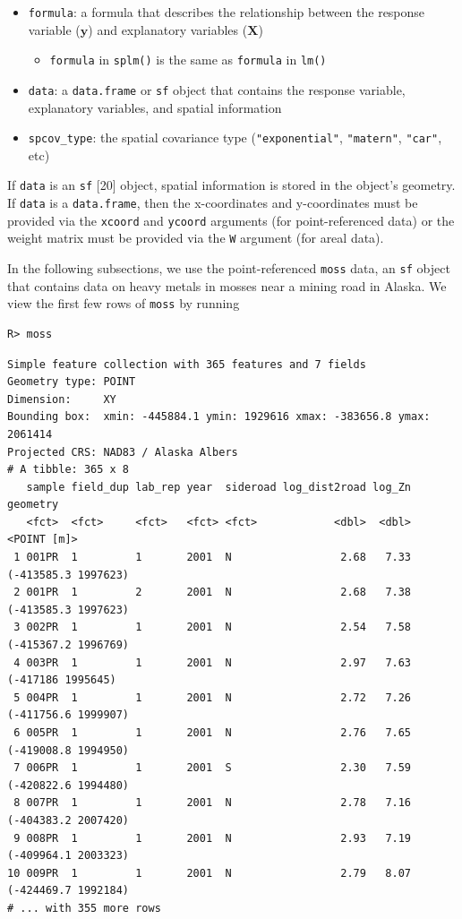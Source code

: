 \documentclass[10pt,letterpaper]{article}
\providecommand{\tightlist}{%
  \setlength{\itemsep}{0pt}\setlength{\parskip}{0pt}}
\begin{document}
\begin{itemize}
\tightlist
\item
  \texttt{formula}: a formula that describes the relationship between
  the response variable (\(\mathbf{y}\)) and explanatory variables
  (\(\mathbf{X}\))

  \begin{itemize}
  \tightlist
  \item
    \texttt{formula} in \texttt{splm()} is the same as \texttt{formula}
    in \texttt{lm()}
  \end{itemize}
\item
  \texttt{data}: a \texttt{data.frame} or \texttt{sf} object that
  contains the response variable, explanatory variables, and spatial
  information
\item
  \texttt{spcov\_type}: the spatial covariance type
  (\texttt{"exponential"}, \texttt{"matern"}, \texttt{"car"}, etc)
\end{itemize}

If \texttt{data} is an \texttt{sf} {[}20{]} object, spatial information
is stored in the object's geometry. If \texttt{data} is a
\texttt{data.frame}, then the x-coordinates and y-coordinates must be
provided via the \texttt{xcoord} and \texttt{ycoord} arguments (for
point-referenced data) or the weight matrix must be provided via the
\texttt{W} argument (for areal data).

In the following subsections, we use the point-referenced \texttt{moss}
data, an \texttt{sf} object that contains data on heavy metals in mosses
near a mining road in Alaska. We view the first few rows of
\texttt{moss} by running

\begin{verbatim}
R> moss
\end{verbatim}

\begin{verbatim}
Simple feature collection with 365 features and 7 fields
Geometry type: POINT
Dimension:     XY
Bounding box:  xmin: -445884.1 ymin: 1929616 xmax: -383656.8 ymax: 2061414
Projected CRS: NAD83 / Alaska Albers
# A tibble: 365 x 8
   sample field_dup lab_rep year  sideroad log_dist2road log_Zn            geometry
   <fct>  <fct>     <fct>   <fct> <fct>            <dbl>  <dbl>         <POINT [m]>
 1 001PR  1         1       2001  N                 2.68   7.33 (-413585.3 1997623)
 2 001PR  1         2       2001  N                 2.68   7.38 (-413585.3 1997623)
 3 002PR  1         1       2001  N                 2.54   7.58 (-415367.2 1996769)
 4 003PR  1         1       2001  N                 2.97   7.63   (-417186 1995645)
 5 004PR  1         1       2001  N                 2.72   7.26 (-411756.6 1999907)
 6 005PR  1         1       2001  N                 2.76   7.65 (-419008.8 1994950)
 7 006PR  1         1       2001  S                 2.30   7.59 (-420822.6 1994480)
 8 007PR  1         1       2001  N                 2.78   7.16 (-404383.2 2007420)
 9 008PR  1         1       2001  N                 2.93   7.19 (-409964.1 2003323)
10 009PR  1         1       2001  N                 2.79   8.07 (-424469.7 1992184)
# ... with 355 more rows
\end{verbatim}
\end{document}
